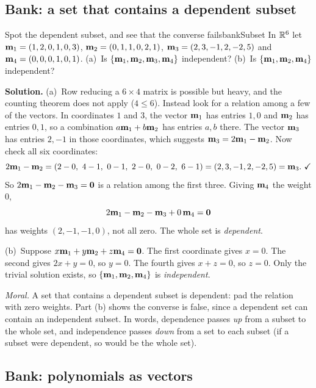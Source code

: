 \documentclass[11pt]{article}
\begin{document}
\subsection*{Bank: a set that contains a dependent subset}

\begin{exmp}{Spot the dependent subset, and see that the converse fails}{bankSubset}
In $\mathbb{R}^6$ let $\mathbf{m}_1=(1,2,0,1,0,3)$, $\mathbf{m}_2=(0,1,1,0,2,1)$, $\mathbf{m}_3=(2,3,-1,2,-2,5)$ and $\mathbf{m}_4=(0,0,0,1,0,1)$. (a)~Is $\{\mathbf{m}_1,\mathbf{m}_2,\mathbf{m}_3,\mathbf{m}_4\}$ independent? (b)~Is $\{\mathbf{m}_1,\mathbf{m}_2,\mathbf{m}_4\}$ independent?

\textbf{Solution.} (a)~Row reducing a $6\times4$ matrix is possible but heavy, and the counting theorem does not apply ($4\le6$). Instead look for a relation among a few of the vectors. In coordinates $1$ and $3$, the vector $\mathbf{m}_1$ has entries $1,0$ and $\mathbf{m}_2$ has entries $0,1$, so a combination $a\mathbf{m}_1+b\mathbf{m}_2$ has entries $a,b$ there. The vector $\mathbf{m}_3$ has entries $2,-1$ in those coordinates, which suggests $\mathbf{m}_3=2\mathbf{m}_1-\mathbf{m}_2$. Now check all six coordinates:
\[
2\bv{m}_1-\bv{m}_2=(2-0,\ 4-1,\ 0-1,\ 2-0,\ 0-2,\ 6-1)=(2,3,-1,2,-2,5)=\bv{m}_3.\ \checkmark
\]
So $2\mathbf{m}_1-\mathbf{m}_2-\mathbf{m}_3=\mathbf{0}$ is a relation among the first three. Giving $\mathbf{m}_4$ the weight $0$,
\[
2\mathbf{m}_1-\mathbf{m}_2-\mathbf{m}_3+0\,\mathbf{m}_4=\mathbf{0}
\]
has weights $(2,-1,-1,0)$, not all zero. The whole set is \emph{dependent}.

(b)~Suppose $x\mathbf{m}_1+y\mathbf{m}_2+z\mathbf{m}_4=\mathbf{0}$. The first coordinate gives $x=0$. The second gives $2x+y=0$, so $y=0$. The fourth gives $x+z=0$, so $z=0$. Only the trivial solution exists, so $\{\mathbf{m}_1,\mathbf{m}_2,\mathbf{m}_4\}$ is \emph{independent}.

\emph{Moral.} A set that contains a dependent subset is dependent: pad the relation with zero weights. Part (b) shows the converse is false, since a dependent set can contain an independent subset. In words, dependence passes \emph{up} from a subset to the whole set, and independence passes \emph{down} from a set to each subset (if a subset were dependent, so would be the whole set).
\end{exmp}

\subsection*{Bank: polynomials as vectors}
\end{document}
